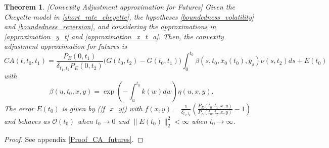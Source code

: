 \documentclass[a4paper,10pt]{article}
\newtheorem{theorem}{Theorem}[section]
\newcommand{\1}{\mathbf{1}}
\begin{document}
\begin{theorem}\label{Th_CA_futures}[Convexity Adjustment approximation for Futures]
Given the Cheyette model in \eqref{short_rate_cheyette}, the hypotheses \ref{boundedness_volatility} and \ref{boundedness_reversion}, and considering the approximations in \eqref{approximation_y_t} and \eqref{approximation_x_t_a}. Then, the convexity adjustment approximation for futures is 
\begin{equation}\label{ca_approximation_futures}
CA(t,t_0,t_1) = \frac{P_{E}(0,t_1)}{\delta_{t_1,t_2} P_{E}(0,t_2)} \biggl(G(t_0,t_2)  - G(t_0,t_1) \biggr) \int_{0}^{t_0} \beta(s,t_0,\bar{x}_0(t_0),\bar{y}_s) \nu(s,t_2) ds + E(t_0)
\end{equation}
with 
\begin{equation*}
\beta(u,t_0,x,y) = \exp\left(-\int_{u}^{t_0}k(w) dw \right) \eta(u,x,y).
\end{equation*}
The error $E(t_0)$ is given by (\ref{f_x_y}) with $f(x,y)=\frac{1}{\delta_{t_1,t_2}}\left(\frac{P_{E}(t_0,t_1,x,y)}{P_{E}(t_0,t_2,x,y)} - 1 \right)$ and behaves as $\mathcal{O}(t_0)$ when $t_0 \to 0$ and $\|E(t_0)\|^{2}_{2} < \infty$ when $t_0 \to \infty$. 
\end{theorem}
\begin{proof}
See appendix \ref{Proof_CA_futures}.
\end{proof}
\end{document}
